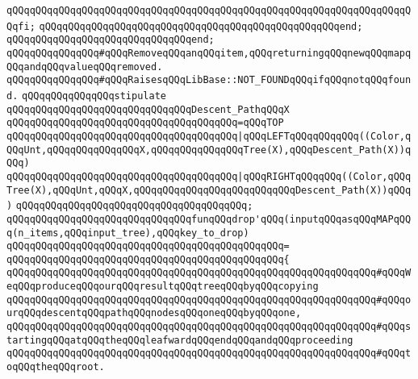 \verb|qQQqqQQqqQQqqQQqqQQqqQQqqQQqqQQqqQQqqQQqqQQqqQQqqQQqqQQqqQQqqQQqqQQqqQQqfi;|\newline
\verb|qQQqqQQqqQQqqQQqqQQqqQQqqQQqqQQqqQQqqQQqqQQqqQQqqQQqend;|\newline
\verb|qQQqqQQqqQQqqQQqqQQqqQQqqQQqqQQqend;|\newline
\newline
\verb|qQQqqQQqqQQqqQQq#qQQqRemoveqQQqanqQQqitem,qQQqreturningqQQqnewqQQqmapqQQqandqQQqvalueqQQqremoved.|\newline
\verb|qQQqqQQqqQQqqQQq#qQQqRaisesqQQqLibBase::NOT_FOUNDqQQqifqQQqnotqQQqfound.|\newline
\newline
\verb|qQQqqQQqqQQqqQQqstipulate|\newline
\newline
\verb|qQQqqQQqqQQqqQQqqQQqqQQqqQQqqQQqDescent_PathqQQqX|\newline
\verb|qQQqqQQqqQQqqQQqqQQqqQQqqQQqqQQqqQQqqQQq=qQQqTOP|\newline
\verb|qQQqqQQqqQQqqQQqqQQqqQQqqQQqqQQqqQQqqQQq|\verb#|qQQqLEFTqQQqqQQqqQQq((Color,qQQqUnt,qQQqqQQqqQQqqQQqX,qQQqqQQqqQQqqQQqTree(X),qQQqDescent_Path(X))qQQq)#\newline
\verb|qQQqqQQqqQQqqQQqqQQqqQQqqQQqqQQqqQQqqQQq|\verb#|qQQqRIGHTqQQqqQQq((Color,qQQqTree(X),qQQqUnt,qQQqX,qQQqqQQqqQQqqQQqqQQqqQQqqQQqDescent_Path(X))qQQq)#\newline
\verb|qQQqqQQqqQQqqQQqqQQqqQQqqQQqqQQqqQQqqQQq;|\newline
\newline
\verb|qQQqqQQqqQQqqQQqqQQqqQQqqQQqqQQqfunqQQqdrop'qQQq(inputqQQqasqQQqMAPqQQq(n_items,qQQqinput_tree),qQQqkey_to_drop)|\newline
\verb|qQQqqQQqqQQqqQQqqQQqqQQqqQQqqQQqqQQqqQQqqQQqqQQq=|\newline
\verb|qQQqqQQqqQQqqQQqqQQqqQQqqQQqqQQqqQQqqQQqqQQqqQQq{|\newline
\verb|qQQqqQQqqQQqqQQqqQQqqQQqqQQqqQQqqQQqqQQqqQQqqQQqqQQqqQQqqQQqqQQq#qQQqWeqQQqproduceqQQqourqQQqresultqQQqtreeqQQqbyqQQqcopying|\newline
\verb|qQQqqQQqqQQqqQQqqQQqqQQqqQQqqQQqqQQqqQQqqQQqqQQqqQQqqQQqqQQqqQQq#qQQqourqQQqdescentqQQqpathqQQqnodesqQQqoneqQQqbyqQQqone,|\newline
\verb|qQQqqQQqqQQqqQQqqQQqqQQqqQQqqQQqqQQqqQQqqQQqqQQqqQQqqQQqqQQqqQQq#qQQqstartingqQQqatqQQqtheqQQqleafwardqQQqendqQQqandqQQqproceeding|\newline
\verb|qQQqqQQqqQQqqQQqqQQqqQQqqQQqqQQqqQQqqQQqqQQqqQQqqQQqqQQqqQQqqQQq#qQQqtoqQQqtheqQQqroot.|\newline

